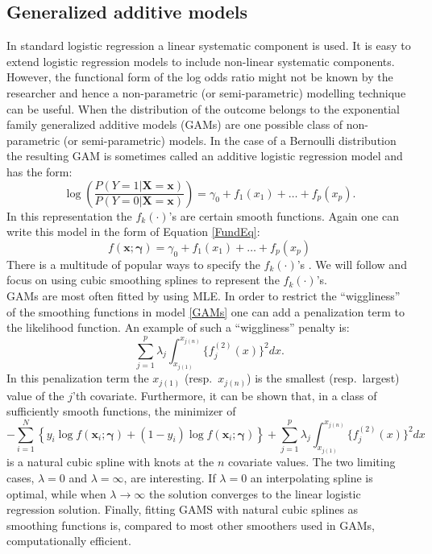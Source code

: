 \subsection{Generalized additive models}
\label{sec:GAM}
In standard logistic regression a linear systematic component is used. It is easy to extend logistic regression models to include non-linear systematic components. However, the functional form of the log odds ratio might not be known by the researcher and hence a non-parametric (or semi-parametric) modelling technique can be useful. When the distribution of the outcome belongs to the exponential family generalized additive models (GAMs) are one possible class of non-parametric (or semi-parametric) models. In the case of a Bernoulli distribution the resulting GAM is sometimes called an additive logistic regression model and has the form:
\begin{equation}
\label{GAMs}
\log \left( \frac{P(Y = 1|\bm{X} = \bm{x} )}{P(Y=0|\bm{X} = \bm{x})} \right) = \gamma_0 + f_1(x_{1}) + \dots + f_p(x_{p}).
\end{equation}
In this representation the $f_k(\cdot)$'s are certain smooth functions. Again one can write this model in the form of Equation \ref{FundEq}:
\[f(\bm{x};\bm{\gamma}) = \gamma_0 + f_1(x_{1}) + \dots + f_p(x_{p})\] 
There is a multitude of popular ways to specify the $f_k(\cdot)$'s \parencite{wood_generalized_2006, hastie_generalized_1990}. We will follow \cite{wood_generalized_2006, wood_gams_2002} and focus on using cubic smoothing splines to represent the $f_k(\cdot)$'s. \\

GAMs are most often fitted by using MLE. In order to restrict the ``wiggliness'' of the smoothing functions in model \ref{GAMs} one can add a penalization term to the likelihood function. An example of such a ``wiggliness'' penalty is:
\[\sum_{j=1}^p \lambda_j \int_{x_{j(1)}}^{x_{j(n)}} \{f^{(2)}_j(x) \}^2dx.\]
In this penalization term the $x_{j(1)}$ (resp.\ $x_{j(n)}$) is the smallest (resp.\ largest) value of the $j$'th covariate. Furthermore, it can be shown that, in a class of sufficiently smooth functions, the minimizer of
\[- \sum_{i=1}^{N} \left\lbrace y_i \log{f(\bm{x}_i;\bm{\gamma})}  + (1-y_i)\log{f(\bm{x}_i;\bm{\gamma})} \right\rbrace + \sum_{j=1}^p \lambda_j \int_{x_{j(1)}}^{x_{j(n)}} \{f_j^{(2)}(x)\}^2 dx\]
is a natural cubic spline with knots at the $n$ covariate values. The two limiting cases, $\lambda = 0$ and $\lambda = \infty$, are interesting. If $\lambda = 0$ an interpolating spline is optimal, while when $\lambda \to \infty$ the solution converges to the linear logistic regression solution. Finally, fitting GAMS with natural cubic splines as smoothing functions is, compared to most other smoothers used in GAMs, computationally efficient.\\

